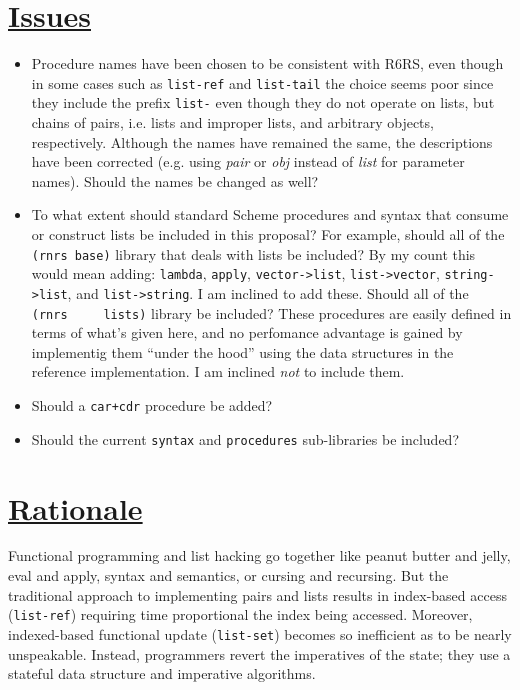 \section{\texorpdfstring{\href{}{Issues}}{Issues}}\label{issues}

\begin{itemize}
\tightlist
\item
  Procedure names have been chosen to be consistent with R6RS, even
  though in some cases such as \texttt{list-ref} and \texttt{list-tail}
  the choice seems poor since they include the prefix \texttt{list-}
  even though they do not operate on lists, but chains of pairs, i.e.
  lists and improper lists, and arbitrary objects, respectively.
  Although the names have remained the same, the descriptions have been
  corrected (e.g. using \emph{pair} or \emph{obj} instead of \emph{list}
  for parameter names). Should the names be changed as well?
\item
  To what extent should standard Scheme procedures and syntax that
  consume or construct lists be included in this proposal? For example,
  should all of the \texttt{(rnrs\ base)} library that deals with lists
  be included? By my count this would mean adding: \texttt{lambda},
  \texttt{apply}, \texttt{vector-\textgreater{}list},
  \texttt{list-\textgreater{}vector},
  \texttt{string-\textgreater{}list}, and
  \texttt{list-\textgreater{}string}. I am inclined to add these. Should
  all of the \texttt{(rnrs\ \ \ \ \ lists)} library be included? These
  procedures are easily defined in terms of what's given here, and no
  perfomance advantage is gained by implementig them ``under the hood''
  using the data structures in the reference implementation. I am
  inclined \emph{not} to include them.
\item
  Should a \texttt{car+cdr} procedure be added?
\item
  Should the current \texttt{syntax} and \texttt{procedures}
  sub-libraries be included?
\end{itemize}

\section{\texorpdfstring{\href{}{Rationale}}{Rationale}}\label{rationale}

Functional programming and list hacking go together like peanut butter
and jelly, eval and apply, syntax and semantics, or cursing and
recursing. But the traditional approach to implementing pairs and lists
results in index-based access (\texttt{list-ref}) requiring time
proportional the index being accessed. Moreover, indexed-based
functional update (\texttt{list-set}) becomes so inefficient as to be
nearly unspeakable. Instead, programmers revert the imperatives of the
state; they use a stateful data structure and imperative algorithms.

